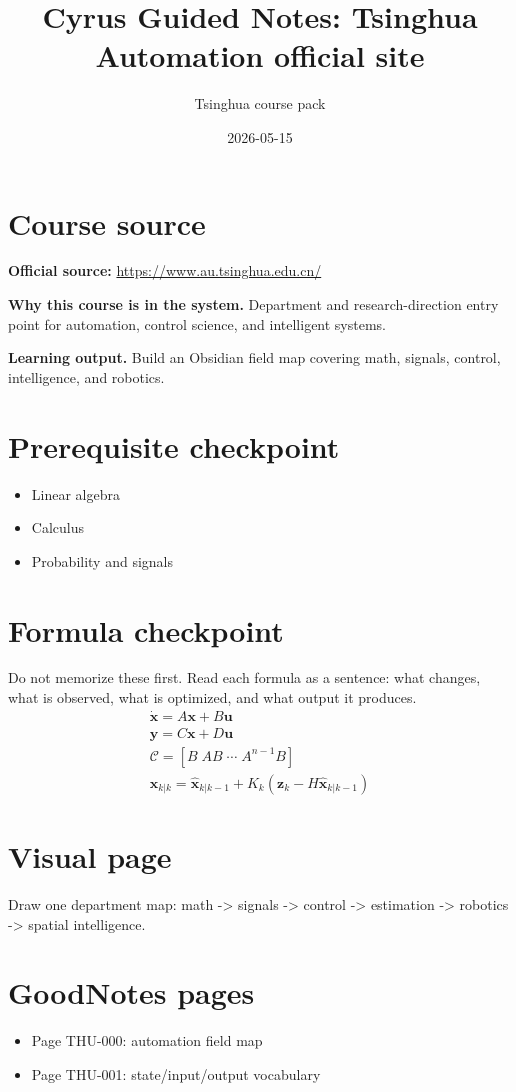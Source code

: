\documentclass[11pt]{article}
\title{Cyrus Guided Notes: Tsinghua Automation official site}
\author{Tsinghua course pack}
\date{2026-05-15}
\begin{document}
\maketitle

\section*{Course source}
\textbf{Official source:} \url{https://www.au.tsinghua.edu.cn/}

\textbf{Why this course is in the system.} Department and research-direction entry point for automation, control science, and intelligent systems.

\textbf{Learning output.} Build an Obsidian field map covering math, signals, control, intelligence, and robotics.

\section*{Prerequisite checkpoint}
\begin{itemize}[leftmargin=1.4em]
  \item Linear algebra
  \item Calculus
  \item Probability and signals
\end{itemize}

\section*{Formula checkpoint}
Do not memorize these first. Read each formula as a sentence: what changes, what is observed, what is optimized, and what output it produces.
\begin{align*}
  \dot{\bm{x}}=A\bm{x}+B\bm{u}\\
  \bm{y}=C\bm{x}+D\bm{u}\\
  \mathcal{C}=[B\;AB\;\cdots\;A^{n-1}B]\\
  \hat{\bm{x}}_{k|k}=\hat{\bm{x}}_{k|k-1}+K_k(\bm{z}_k-H\hat{\bm{x}}_{k|k-1})
\end{align*}

\section*{Visual page}
Draw one department map: math -> signals -> control -> estimation -> robotics -> spatial intelligence.

\section*{GoodNotes pages}
\begin{itemize}[leftmargin=1.4em]
  \item Page THU-000: automation field map
  \item Page THU-001: state/input/output vocabulary
\end{itemize}
\end{document}
